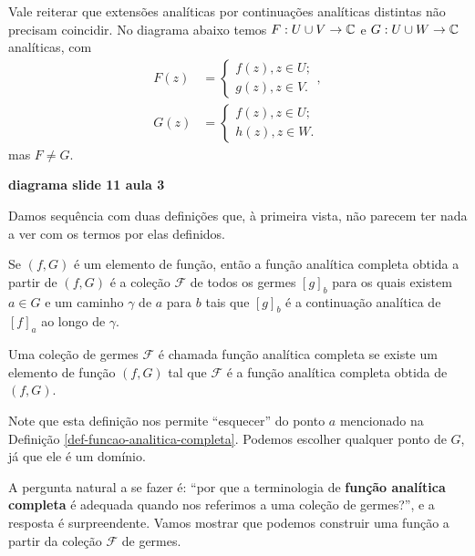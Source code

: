 \begin{observacao}
        Vale reiterar que extensões analíticas por continuações analíticas distintas
        não precisam coincidir. No diagrama abaixo temos $F: U\cup V\to\mathbb{C}$
        e $G:U\cup W\to\mathbb{C}$ analíticas, com
        \begin{align*}
            F(z) &= 
            \begin{cases}
                f(z), z\in U; \\
                g(z), z\in V.
            \end{cases}, \\
            G(z) &= 
            \begin{cases}
                f(z), z\in U; \\
                h(z), z\in W.
            \end{cases}
        \end{align*}
        mas $F\neq G$.
        \begin{center}
            \textbf{diagrama slide 11 aula 3}
        \end{center}
    \end{observacao}

Damos sequência com duas definições que, à primeira vista, não parecem ter 
nada a ver com os termos por elas definidos.

    \begin{definicao}
    \label{def-funcao-analitica-completa}
        Se $(f,G)$ é um elemento de função, então a função analítica completa obtida
        a partir de $(f,G)$ é a coleção $\mathcal{F}$ de todos os germes $[g]_b$ 
        para os quais existem $a\in G$ e um caminho $\gamma$ de $a$ para $b$ 
        tais que $[g]_b$ é a continuação analítica de $[f]_a$ ao longo de $\gamma$.
    \end{definicao}


    \begin{definicao}
        Uma coleção de germes $\mathcal{F}$ é chamada função analítica completa se
        existe um elemento de função $(f,G)$ tal que $\mathcal{F}$ é a função analítica
        completa obtida de $(f,G)$.
    \end{definicao}

Note que esta definição nos permite ``esquecer'' do ponto $a$ mencionado na
Definição \ref{def-funcao-analitica-completa}. Podemos escolher qualquer ponto
de $G$, já que ele é um domínio.

A pergunta natural a se fazer é: ``por que a terminologia de 
\textbf{função analítica completa} é adequada quando nos referimos a uma
coleção de germes?'', e a resposta é surpreendente. Vamos mostrar que
podemos construir uma função a partir da coleção $\mathcal{F}$ de germes.

